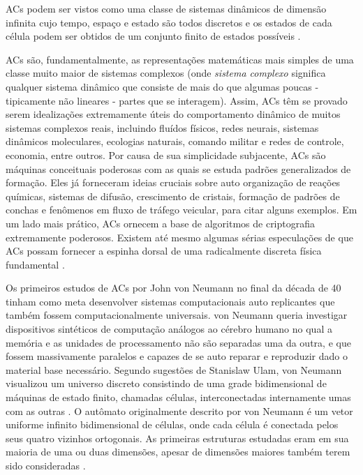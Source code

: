 \documentclass[12pt,a4paper]{article}
\begin{document}
ACs podem ser vistos como uma classe de sistemas dinâmicos de dimensão
infinita cujo tempo, espaço e estado são todos discretos e os estados de cada célula
podem ser obtidos de um conjunto finito de estados possíveis . 

ACs são, fundamentalmente, as representações matemáticas mais simples
de uma classe muito maior de sistemas complexos (onde \textit{sistema complexo} significa
qualquer sistema dinâmico que consiste de mais do que algumas poucas - tipicamente
não lineares - partes que se interagem). Assim, ACs têm se provado
serem idealizações extremamente úteis do comportamento dinâmico de muitos sistemas
complexos reais, incluindo fluídos físicos, redes neurais, sistemas dinâmicos
moleculares, ecologias naturais, comando militar e redes de controle, economia, entre
outros. Por causa de sua simplicidade subjacente, ACs são máquinas
conceituais poderosas com as quais se estuda padrões generalizados de formação. Eles
já forneceram ideias cruciais sobre auto organização de reações químicas, sistemas de
difusão, crescimento de cristais, formação de padrões de conchas e fenômenos em fluxo
de tráfego veicular, para citar alguns exemplos. Em um lado mais prático, ACs
ornecem a base de algoritmos de criptografia extremamente poderosos. Existem
até mesmo algumas sérias especulações de que ACs possam fornecer
a espinha dorsal de uma radicalmente discreta física fundamental .

Os primeiros estudos de ACs por John von Neumann no final da década de
40 tinham como meta desenvolver sistemas computacionais auto replicantes que também fossem
computacionalmente universais. von Neumann queria investigar dispositivos sintéticos de
computação análogos ao cérebro humano no qual a memória e as unidades de processamento
não são separadas uma da outra, e que fossem massivamente paralelos e capazes de se
auto reparar e reproduzir dado o material base necessário. Segundo sugestões de
Stanislaw Ulam, von Neumann visualizou um universo discreto consistindo de uma grade
bidimensional de máquinas de estado finito, chamadas células, interconectadas
internamente umas com as outras . O autômato originalmente descrito por
von Neumann é um vetor uniforme infinito bidimensional de células, onde cada célula é
conectada pelos seus quatro vizinhos ortogonais. As primeiras estruturas estudadas eram
em sua maioria de uma ou duas dimensões, apesar de dimensões maiores também terem sido
consideradas .
\end{document}
